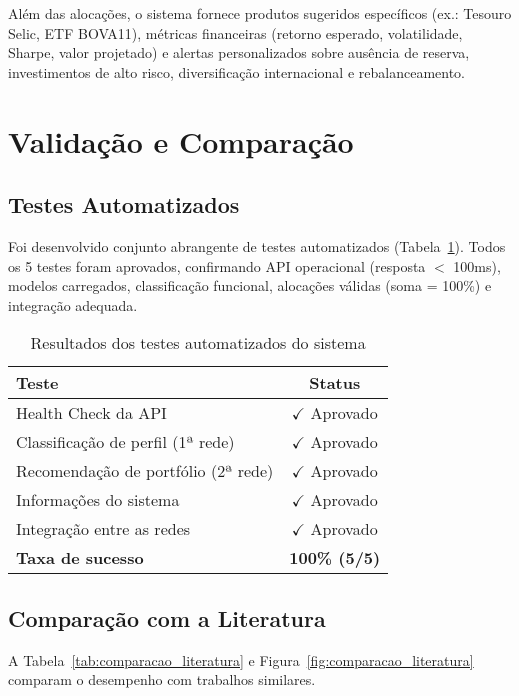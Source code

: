 Além das alocações, o sistema fornece produtos sugeridos específicos (ex.: Tesouro Selic, ETF BOVA11), métricas financeiras (retorno esperado, volatilidade, Sharpe, valor projetado) e alertas personalizados sobre ausência de reserva, investimentos de alto risco, diversificação internacional e rebalanceamento.

\section{Validação e Comparação}

\subsection{Testes Automatizados}

Foi desenvolvido conjunto abrangente de testes automatizados (Tabela~\ref{tab:testes_automatizados}). Todos os 5 testes foram aprovados, confirmando API operacional (resposta $<$ 100ms), modelos carregados, classificação funcional, alocações válidas (soma = 100\%) e integração adequada.

\begin{table}[htbp]
\centering
\caption{Resultados dos testes automatizados do sistema}
\label{tab:testes_automatizados}
\begin{tabular}{@{}lc@{}}
\toprule
\textbf{Teste} & \textbf{Status} \\ \midrule
Health Check da API & $\checkmark$ Aprovado \\
Classificação de perfil (1ª rede) & $\checkmark$ Aprovado \\
Recomendação de portfólio (2ª rede) & $\checkmark$ Aprovado \\
Informações do sistema & $\checkmark$ Aprovado \\
Integração entre as redes & $\checkmark$ Aprovado \\ \midrule
\textbf{Taxa de sucesso} & \textbf{100\% (5/5)} \\ \bottomrule
\end{tabular}
\end{table}

\subsection{Comparação com a Literatura}

A Tabela~\ref{tab:comparacao_literatura} e Figura~\ref{fig:comparacao_literatura} comparam o desempenho com trabalhos similares.

